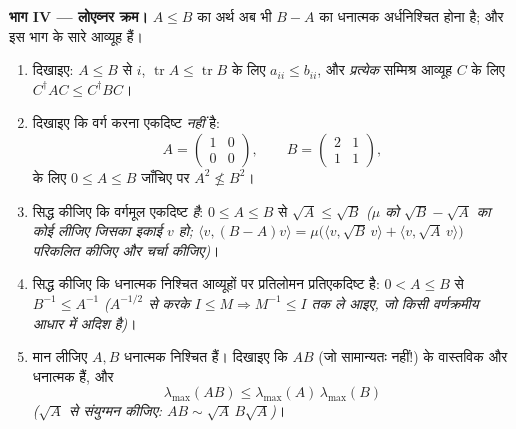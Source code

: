 \begin{problem}
\medskip
\noindent\textbf{भाग IV --- लोएव्नर क्रम।} $A \leq B$ का अर्थ अब भी $B - A$ का
धनात्मक अर्धनिश्चित होना है; और इस भाग के सारे आव्यूह  हैं।
\begin{enumerate}[resume]
  \item दिखाइए: $A \leq B$ से $i$, $\operatorname{tr} A \leq \operatorname{tr} B$ के लिए $a_{ii} \leq b_{ii}$, और \emph{प्रत्येक} सम्मिश्र
        आव्यूह $C$ के लिए $C^\dagger AC \leq C^\dagger BC$।
  \item दिखाइए कि वर्ग करना एकदिष्ट \emph{नहीं} है:
        \[
        A = \begin{pmatrix} 1 & 0\\ 0 & 0\end{pmatrix},
        \qquad
        B = \begin{pmatrix} 2 & 1\\ 1 & 1\end{pmatrix},
        \]
        के लिए $0 \leq A \leq B$ जाँचिए पर $A^2 \not\leq B^2$।
  \item सिद्ध कीजिए कि वर्गमूल एकदिष्ट \emph{है}: $0 \leq
        A \leq B$ से $\sqrt A \leq \sqrt B$ \emph{($\mu$
        को $\sqrt B - \sqrt A$ का कोई  लीजिए जिसका इकाई 
        $v$ हो; $\langle v, (B - A)v\rangle =
        \mu\bigl(\langle v, \sqrt B\,v\rangle + \langle v,
        \sqrt A\,v\rangle\bigr)$ परिकलित कीजिए और चर्चा कीजिए)}।
  \item सिद्ध कीजिए कि धनात्मक निश्चित आव्यूहों पर प्रतिलोमन प्रतिएकदिष्ट
        है: $0 < A \leq B$ से $B^{-1} \leq A^{-1}$ \emph{($A^{-1/2}$ से  करके $I \leq M
        \Rightarrow M^{-1} \leq I$ तक ले
        आइए, जो किसी वर्णक्रमीय आधार में अदिश है)}।
  \item मान लीजिए $A, B$ धनात्मक निश्चित हैं। दिखाइए कि $AB$ (जो सामान्यतः
         नहीं!) के  वास्तविक और धनात्मक हैं, और
        \[
        \lambda_{\max}(AB) \leq
        \lambda_{\max}(A)\,\lambda_{\max}(B)
        \]
        \emph{($\sqrt A$ से संयुग्मन कीजिए: $AB \sim \sqrt
        A\,B\sqrt A$)}।
\end{enumerate}


\end{problem}
